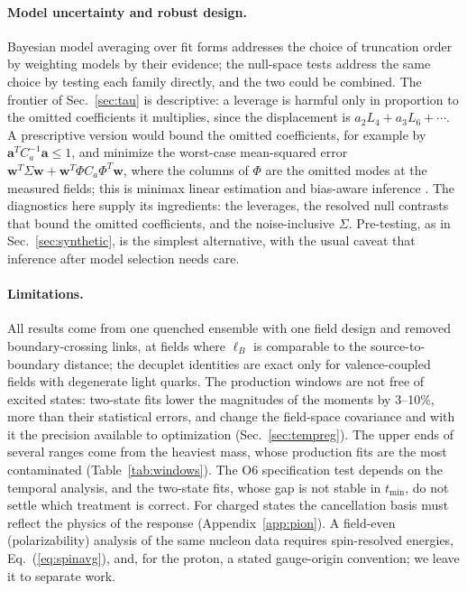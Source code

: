 \documentclass[aps,prd,preprint,nofootinbib,floatfix]{revtex4-2}
\begin{document}
\paragraph{Model uncertainty and robust design.} Bayesian model averaging over fit forms \cite{JayNeil2021} addresses the choice of truncation order by weighting models by their evidence; the null-space tests address the same choice by testing each family directly, and the two could be combined. The frontier of Sec.~\ref{sec:tau} is descriptive: a leverage is harmful only in proportion to the omitted coefficients it multiplies, since the displacement is $a_2L_4+a_3L_6+\cdots$. A prescriptive version would bound the omitted coefficients, for example by $\bm a^TC_a^{-1}\bm a\le1$, and minimize the worst-case mean-squared error $\bm w^T\Sigma\bm w+\bm w^T\Phi C_a\Phi^T\bm w$, where the columns of $\Phi$ are the omitted modes at the measured fields; this is minimax linear estimation \cite{Donoho1994} and bias-aware inference \cite{ArmstrongKolesar2018}. The diagnostics here supply its ingredients: the leverages, the resolved null contrasts that bound the omitted coefficients, and the noise-inclusive $\Sigma$. Pre-testing, as in Sec.~\ref{sec:synthetic}, is the simplest alternative, with the usual caveat that inference after model selection needs care.

\paragraph{Limitations.} All results come from one quenched ensemble with one field design and removed boundary-crossing links, at fields where $\ell_B$ is comparable to the source-to-boundary distance; the decuplet identities are exact only for valence-coupled fields with degenerate light quarks. The production windows are not free of excited states: two-state fits lower the magnitudes of the moments by 3--10\%, more than their statistical errors, and change the field-space covariance and with it the precision available to optimization (Sec.~\ref{sec:tempreg}). The upper ends of several ranges come from the heaviest mass, whose production fits are the most contaminated (Table~\ref{tab:windows}). The O6 specification test depends on the temporal analysis, and the two-state fits, whose gap is not stable in $t_{\min}$, do not settle which treatment is correct. For charged states the cancellation basis must reflect the physics of the response (Appendix~\ref{app:pion}). A field-even (polarizability) analysis of the same nucleon data requires spin-resolved energies, Eq.~(\ref{eq:spinavg}), and, for the proton, a stated gauge-origin convention; we leave it to separate work.
\end{document}
